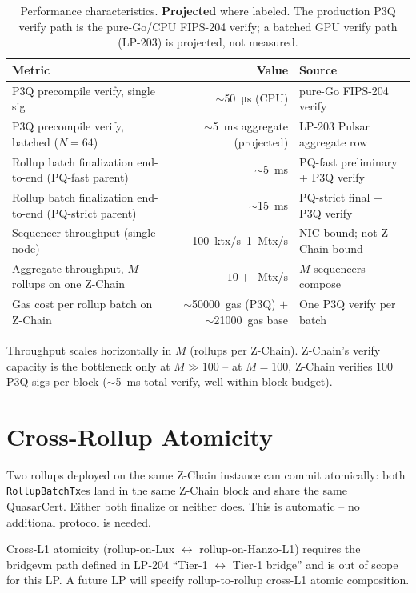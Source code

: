 \begin{table}[h]
\centering
\small
\begin{tabular}{@{}p{6cm}rl@{}}
\toprule
\textbf{Metric} & \textbf{Value} & \textbf{Source} \\
\midrule
P3Q precompile verify, single sig & $\sim$\SI{50}{\micro\second} (CPU) & pure-Go FIPS-204 verify \\
P3Q precompile verify, batched ($N{=}64$) & $\sim$\SI{5}{\milli\second} aggregate (projected) & LP-203 Pulsar aggregate row \\
Rollup batch finalization end-to-end (PQ-fast parent) & $\sim$\SI{5}{\milli\second} & PQ-fast preliminary + P3Q verify \\
Rollup batch finalization end-to-end (PQ-strict parent) & $\sim$\SI{15}{\milli\second} & PQ-strict final + P3Q verify \\
Sequencer throughput (single node) & \SI{100}{\kilo tx/s}--\SI{1}{\mega tx/s} & NIC-bound; not Z-Chain-bound \\
Aggregate throughput, $M$ rollups on one Z-Chain & $10{+}$\SI{}{\mega tx/s} & $M$ sequencers compose \\
Gas cost per rollup batch on Z-Chain & $\sim$\SI{50000}{gas} (P3Q) $+$ $\sim$\SI{21000}{gas} base & One P3Q verify per batch \\
\bottomrule
\end{tabular}
\caption{Performance characteristics. \textbf{Projected} where
labeled. The production P3Q verify path is the pure-Go/CPU FIPS-204
verify; a batched GPU verify path (LP-203) is projected, not
measured.}
\label{tab:performance}
\end{table}

Throughput scales horizontally in $M$ (rollups per Z-Chain).
Z-Chain's verify capacity is the bottleneck only at $M \gg 100$ --
at $M{=}100$, Z-Chain verifies 100 P3Q sigs per block
($\sim$\SI{5}{\milli\second} total verify, well within block
budget).

\section{Cross-Rollup Atomicity}

Two rollups deployed on the same Z-Chain instance can commit
atomically: both \texttt{RollupBatchTx}es land in the same Z-Chain
block and share the same QuasarCert. Either both finalize or
neither does. This is automatic -- no additional protocol is
needed.

Cross-L1 atomicity (rollup-on-Lux $\leftrightarrow$
rollup-on-Hanzo-L1) requires the bridgevm path defined in LP-204
``Tier-1 $\leftrightarrow$ Tier-1 bridge'' and is out of scope for
this LP. A future LP will specify rollup-to-rollup cross-L1
atomic composition.

